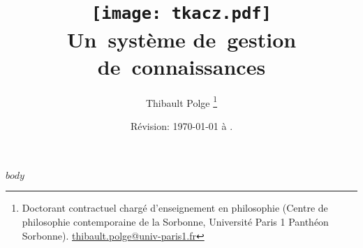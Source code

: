 \documentclass[11pt, french]{book} %
\begin{document}
\title{%
\vspace{-3cm}
\texttt{[image: tkacz.pdf]}
\\
Un~système de~gestion de~connaissances
}
\author{Thibault Polge%
\thanks{Doctorant contractuel chargé d'enseignement en philosophie (Centre de philosophie contemporaine de la Sorbonne, Université Paris 1 Panthéon Sorbonne). \href{mailto:thibault.polge@univ-paris1.fr}{\mbox{thibault.polge@univ-paris1.fr}}
}
}

\date{Révision: \today{} à \currenttime.}
\date{}

\maketitle


$body$

\renewcommand*\listtablename{Tableaux et figures}
\listoftables

%

\tableofcontents
\end{document}
